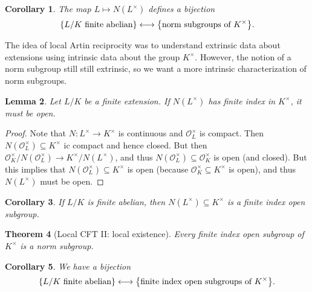 \documentclass[leqno, openany]{memoir}
\newtheorem{thm}{Theorem}[section]
\newtheorem{cor}[thm]{Corollary}
\newtheorem{lem}[thm]{Lemma}
\theoremstyle{definition}
\theoremstyle{remark}
\theoremstyle{plain}
\theoremstyle{definition}
\theoremstyle{remark}
\newcommand{\mc}[1]{\mathcal{#1}}
\begin{document}
\begin{cor}
    The map $L \mapsto N(L^{\times})$ defines a bijection
    \[ \qty{L/K\ \text{finite abelian}} \longleftrightarrow \qty{\text{norm subgroups of } K^{\times}}. \]
\end{cor}

The idea of local Artin reciprocity was to understand extrinsic data about extensions using intrinsic data about the group $K^{\times}$. However, the notion of a norm subgroup still still extrinsic, so we want a more intrinsic characterization of norm subgroups.

\begin{lem}
    Let $L/K$ be a finite extension. If $N(L^{\times})$ has finite index in $K^{\times}$, it must be open.
\end{lem}

\begin{proof}
    Note that $N \colon L^{\times} \to K^{\times}$ is continuous and $\mc{O}_L^{\times}$ is compact. Then $N(\mc{O}_L^{\times}) \subseteq K^{\times}$ ic compact and hence closed. But then $\mc{O}_K^{\times} / N(\mc{O}_L^{\times}) \to K^{\times}/N(L^{\times})$, and thus $N(\mc{O}_L^{\times}) \subseteq \mc{O}_K^{\times}$ is open (and closed). But this implies that $N(\mc{O}_L^{\times}) \subseteq K^{\times}$ is open (because $\mc{O}_K^{\times} \subseteq K^{\times}$ is open), and thus $N(L^{\times})$ must be open.
\end{proof}

\begin{cor}
    If $L/K$ is finite abelian, then $N(L^{\times}) \subseteq K^{\times}$ is a finite index open subgroup.
\end{cor}

\begin{thm}[Local CFT II: local existence]
    Every finite index open subgroup of $K^{\times}$ is a norm subgroup.
\end{thm}

\begin{cor}
    We have a bijection
    \[ \qty{L/K\ \text{finite abelian}} \longleftrightarrow \qty{\text{finite index open subgroups of } K^{\times}}. \]
\end{cor}
\end{document}
